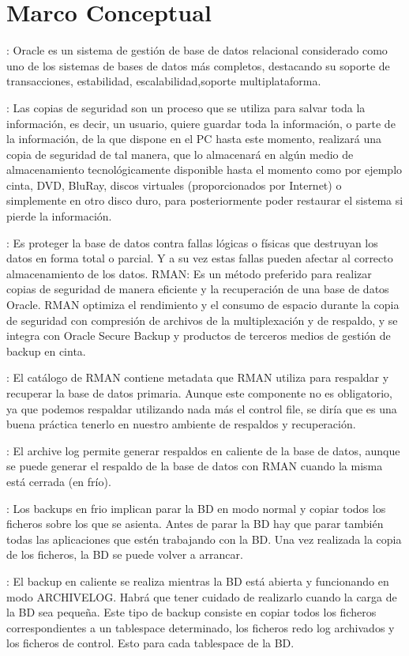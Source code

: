 \section{Marco Conceptual}
\textbf{}: Oracle es un sistema de gestión de base de datos relacional considerado como uno de los sistemas de bases de datos más completos, destacando su soporte de transacciones, estabilidad, escalabilidad,soporte multiplataforma.

\textbf{}: Las copias de seguridad son un proceso que se utiliza para salvar toda la información, es decir, un usuario, quiere guardar toda la información, o parte de la información, de la que dispone en el PC hasta este momento, realizará una copia de seguridad de tal manera, que lo almacenará en algún medio de almacenamiento tecnológicamente disponible hasta el momento como por ejemplo cinta, DVD, BluRay, discos virtuales (proporcionados por Internet) o simplemente en otro disco duro, para posteriormente poder restaurar el sistema si pierde la información.

\textbf{}: Es proteger la base de datos contra fallas lógicas o físicas que destruyan los datos en forma total o parcial. Y a su vez estas fallas pueden afectar al correcto almacenamiento de los datos.
RMAN: Es un método preferido para realizar copias de seguridad de manera eficiente y la recuperación de una base de datos Oracle. RMAN optimiza el rendimiento y el consumo de espacio durante la copia de seguridad con compresión de archivos de la multiplexación y de respaldo, y se integra con Oracle Secure Backup y productos de terceros medios de gestión de backup en cinta.

\textbf{}: El catálogo de RMAN contiene metadata que RMAN utiliza para respaldar y recuperar la base de datos primaria. Aunque este componente no es obligatorio, ya que podemos respaldar utilizando nada más el control file, se diría que es una buena práctica tenerlo en nuestro ambiente de respaldos y recuperación.

\textbf{}: El archive log permite generar respaldos en caliente de la base de datos, aunque se puede generar el respaldo de la base de datos con RMAN cuando la misma está cerrada (en frío).

\textbf{}: Los backups en frio implican parar la BD en modo normal y copiar todos los ficheros sobre los que se asienta. Antes de parar la BD hay que parar también todas las aplicaciones que estén trabajando con la BD. Una vez realizada la copia de los ficheros, la BD se puede volver a arrancar.

\textbf{}: El backup en caliente se realiza mientras la BD está abierta y funcionando en modo ARCHIVELOG. Habrá que tener cuidado de realizarlo cuando la carga de la BD sea pequeña.
Este tipo de backup consiste en copiar todos los ficheros correspondientes a un tablespace determinado, los ficheros redo log archivados y los ficheros de control. Esto para cada tablespace de la BD.


